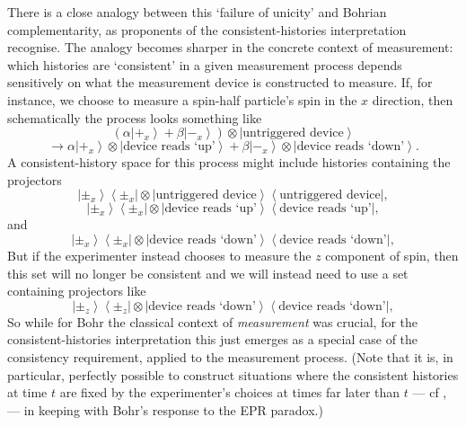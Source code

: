 \documentclass[12pt]{article}
\newcommand{\be}{\begin{equation}}
\newcommand{\ee}{\end{equation}}
\newcommand{\ket}[1]{\ensuremath{\left|  #1 \right\rangle}}
\newcommand{\bra}[1]{\ensuremath{\left\langle #1 \right|}}
\newcommand{\proj}[2]{\ensuremath{\ket{#1} \bra{#2}}}
\newcommand{\tpk}[2]{\ensuremath{\ket{#1}\!\otimes\!\ket{#2}}}
\begin{document}
There is a close analogy between this `failure of unicity' and Bohrian complementarity, as proponents of the consistent-histories interpretation recognise. The analogy becomes sharper in the concrete context of measurement: which histories are `consistent' in a given measurement process depends sensitively on what the measurement device is constructed to measure.  If, for instance, we choose to measure a spin-half particle's spin in the $x$ direction, then schematically the process looks something like
\[
(\alpha\ket{+_x}+\beta \ket{-_x})\otimes\ket{\mathrm{\mbox{untriggered device}}}
\]
\be
\longrightarrow
\alpha \tpk{+_x}{\mathrm{\mbox{device reads `up'}}}
+
\beta
\tpk{-_x}{\mathrm{\mbox{device reads `down'}}}.
\ee
A consistent-history space for this process might include histories containing the projectors
\[
\proj{\pm_x}{\pm_x}\otimes\proj{\mathrm{\mbox{untriggered device}}}{\mathrm{\mbox{untriggered device}}},
\]
\[
\proj{\pm_x}{\pm_x}\otimes\proj{\mathrm{\mbox{device reads `up'}}}{\mathrm{\mbox{device reads `up'}}},
\]
and
\[
\proj{\pm_x}{\pm_x}\otimes\proj{\mathrm{\mbox{device reads `down'}}}{\mathrm{\mbox{device reads `down'}}},
\]
But if the experimenter instead chooses to measure the $z$ component of spin, then this set will no longer be consistent
and we will instead need to use a set containing projectors like
\[
\proj{\pm_z}{\pm_z}\otimes\proj{\mathrm{\mbox{device reads `down'}}}{\mathrm{\mbox{device reads `down'}}},
\]
So while for Bohr the classical context of \emph{measurement} was crucial, for the consistent-histories interpretation this just emerges as a special case of the consistency requirement, applied to the measurement process.  (Note that it is, in particular, perfectly possible to construct situations where the consistent histories at time $t$ are fixed by the experimenter's choices at times far later than $t$ --- cf ,  --- in keeping with Bohr's response to the EPR paradox.)
\end{document}
